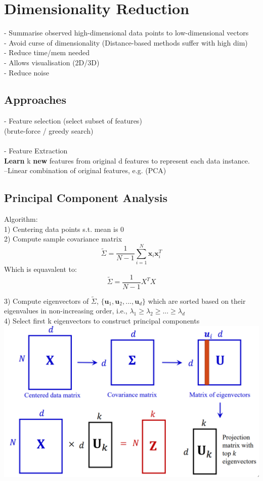 \section{Dimensionality Reduction}
- Summarise observed high-dimensional data points to low-dimensional vectors\\
- Avoid curse of dimensionality (Distance-based methods suffer with high dim)\\
- Reduce time/mem needed\\
- Allows visualisation (2D/3D)\\
- Reduce noise\\
\subsection*{Approaches}
- Feature selection (select subset of features)\\
(brute-force / greedy search)\\\\
- Feature Extraction\\
\textbf{Learn} k \textbf{new} features from original d features to 
represent each data instance.\\
--Linear combination of original features, e.g. (PCA)
\subsection*{Principal Component Analysis}
Algorithm:\\
1) Centering data points s.t. mean is 0\\
2) Compute sample covariance matrix\\
\[\tilde{\Sigma} = \frac{1}{N-1}\sum^N_{i=1}\mathbf{x}_i\mathbf{x}_i^T\]
Which is equavalent to:
\[\tilde{\Sigma} = \frac{1}{N-1}X^TX\]

3) Compute eigenvectors of $\tilde{\Sigma}$, $\{\mathbf{u}_1,\mathbf{u}_2,...,\mathbf{u}_d\}$
which are sorted based on their eigenvalues in non-increasing order,
i.e., $\lambda_1 \geq \lambda_2 \geq ... \geq \lambda_d$\\
4) Select first k eigenvectors to construct principal components\\
\includegraphics[width=\linewidth]{fig/pca1.PNG}
